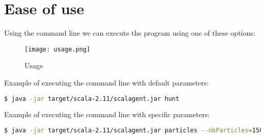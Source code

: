 \section{Ease of use}
\label{sec:Ease}
Using the command line we can execute the program using one of these options:\\


\begin{figure}[H]
   \texttt{[image: usage.png]}
   \caption{Usage}
\end{figure}



Example of executing the command line with default parameters:
\begin{lstlisting}[language=bash]
  $ java -jar target/scala-2.11/scalagent.jar hunt
\end{lstlisting}

Example of executing the command line with specific parameters:
\begin{lstlisting}[language=bash]
  $ java -jar target/scala-2.11/scalagent.jar particles --nbParticles=15000 --toroidal=true
\end{lstlisting}